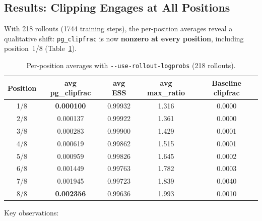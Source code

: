 \documentclass[11pt,a4paper]{article}
\begin{document}
\subsection{Results: Clipping Engages at All Positions}

With 218 rollouts (1744 training steps), the per-position averages reveal a
qualitative shift: \texttt{pg\_clipfrac} is now \textbf{nonzero at every
position}, including position~1/8 (Table~\ref{tab:rollout_lp_positions}).

\begin{table}[H]
\centering
\caption{Per-position averages with \texttt{-{}-use-rollout-logprobs} (218 rollouts).}
\label{tab:rollout_lp_positions}
\begin{tabular}{@{}ccccc@{}}
\toprule
\textbf{Position} & \textbf{avg pg\_clipfrac} & \textbf{avg ESS} & \textbf{avg max\_ratio} & \textbf{Baseline clipfrac} \\
\midrule
1/8 & \textbf{0.000100} & 0.99932 & 1.316 & 0.0000 \\
2/8 & 0.000137 & 0.99922 & 1.361 & 0.0000 \\
3/8 & 0.000283 & 0.99900 & 1.429 & 0.0001 \\
4/8 & 0.000619 & 0.99862 & 1.515 & 0.0001 \\
5/8 & 0.000959 & 0.99826 & 1.645 & 0.0002 \\
6/8 & 0.001449 & 0.99763 & 1.782 & 0.0003 \\
7/8 & 0.001945 & 0.99723 & 1.839 & 0.0040 \\
8/8 & \textbf{0.002356} & 0.99636 & 1.993 & 0.0010 \\
\bottomrule
\end{tabular}
\end{table}

Key observations:
\end{document}
